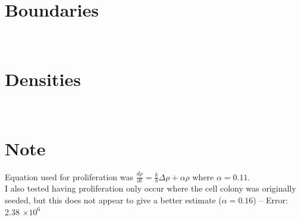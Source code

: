 \documentclass[12pt]{article}
\begin{document}
\section*{Boundaries}
\begin{figure}[h!]
	 \\
\end{figure}


\section*{Densities}
\begin{figure}[h!]
	 \\
\end{figure}


\section*{Note}
Equation used for proliferation was $\frac{d \rho}{dt} = \frac{k}{b} \Delta \rho + \alpha \rho$ where $\alpha=0.11$.\\


I also tested having proliferation only occur where the cell colony was originally seeded, but this does not appear to give a better estimate ($\alpha=0.16$) -- Error: 2.38 $\times 10^6$
\end{document}
